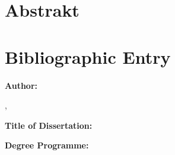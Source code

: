 {  %
  \thispagestyle{plain}
  \section*{Abstrakt}
  \noindent
  \@AbstractCZE
  \vfill
  \clearpage

  \thispagestyle{plain}
  \section*{Bibliographic Entry}
  \noindent
  \begin{minipage}[t]{0.25\textwidth}\vspace{0pt}%
    \doccol \textbf{Author:}
  \end{minipage}
  \hspace{0.05\textwidth}
  \begin{minipage}[t]{0.7\textwidth}\vspace{0pt}%
    \@author, \par
    \@AuthorAffENG
  \end{minipage} \par
  \vspace{0.5cm}
  \noindent
  \begin{minipage}[t]{0.25\textwidth}\vspace{0pt}%
    \doccol \textbf{Title of Dissertation:}
  \end{minipage}
  \hspace{0.05\textwidth}
  \begin{minipage}[t]{0.7\textwidth}\vspace{0pt}%
    \textbf{\@TitleENG}
  \end{minipage} \par
  \vspace{0.5cm}
  \noindent
  \begin{minipage}[t]{0.25\textwidth}\vspace{0pt}%
    \doccol \textbf{Degree Programme:}
  \end{minipage}
  \hspace{0.05\textwidth}
  \begin{minipage}[t]{0.7\textwidth}\vspace{0pt}%
    \@DegreeProgrammeENG
  \end{minipage} \par
  \vspace{0.5cm}
  \noindent
  \begin{minipage}[t]{0.25\textwidth}\vspace{0pt}%

\end{minipage}}
